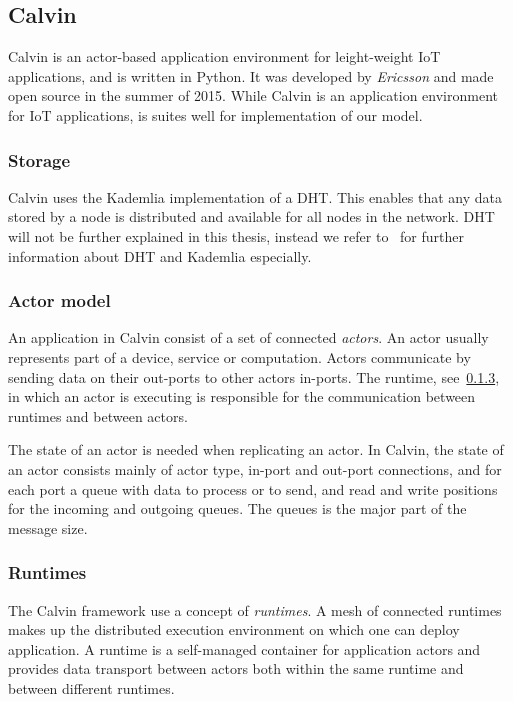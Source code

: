 \documentclass{cslthse-msc}
\begin{document}
\subsection{Calvin} \label{subsec:design_calvin}
Calvin is an actor-based application environment for leight-weight IoT applications, and is written in Python. It was developed by \emph{Ericsson} and made open source in the summer of 2015. While Calvin is an application environment for IoT applications, is suites well for implementation of our model.

\subsubsection{Storage} \label{sec:calvin_storage}
Calvin uses the Kademlia implementation of a DHT. This enables that any data stored by a node is distributed and available for all nodes in the network. DHT will not be further explained in this thesis, instead we refer to~\cite{kademlia} for further information about DHT and Kademlia especially.

\subsubsection{Actor model}
An application in Calvin consist of a set of connected \emph{actors}. An actor usually represents part of a device, service or computation. Actors communicate by sending data on their out-ports to other actors in-ports. The runtime, see~\cref{sec:calvin_runtime}, in which an actor is executing is responsible for the communication between runtimes and between actors.

The state of an actor is needed when replicating an actor. In Calvin, the state of an actor consists mainly of actor type, in-port and out-port connections, and for each port a queue with data to process or to send, and read and write positions for the incoming and outgoing queues. The queues is the major part of the message size.

\subsubsection{Runtimes} \label{sec:calvin_runtime}
The Calvin framework use a concept of \emph{runtimes}. A mesh of connected runtimes makes up the distributed execution environment on which one can deploy application. A runtime is a self-managed container for application actors and provides data transport between actors both within the same runtime and between different runtimes.
\end{document}
